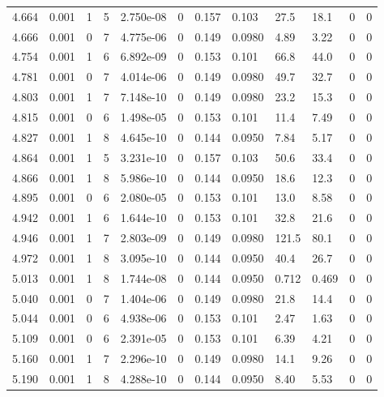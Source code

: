 \documentclass[preview]{standalone}
\begin{document}
{{{{{\begin{tabular}{L{1.2cm}C{1.2cm} C{0.3cm}C{0.5cm} C{1.4cm}C{1.4cm} C{1.4cm}C{1.4cm} C{1.6cm}C{1.6cm} C{1.6cm}C{1.6cm}}
  4.664  &  0.001  & 1     &  5 &  2.750e-08  & 0  &  0.157&   0.103& 27.5 & 18.1   &  0 & 0  \\ 
  4.666  &  0.001  & 0     &  7 &  4.775e-06  & 0  &  0.149&   0.0980& 4.89 & 3.22   &  0 & 0  \\ 
  4.754  &  0.001  & 1     &  6 &  6.892e-09  & 0  &  0.153&   0.101& 66.8 & 44.0   &  0 & 0  \\ 
  4.781  &  0.001  & 0     &  7 &  4.014e-06  & 0  &  0.149&   0.0980& 49.7 & 32.7   &  0 & 0  \\ 
  4.803  &  0.001  & 1     &  7 &  7.148e-10  & 0  &  0.149&   0.0980& 23.2 & 15.3   &  0 & 0  \\ 
  4.815  &  0.001  & 0     &  6 &  1.498e-05  & 0  &  0.153&   0.101& 11.4 & 7.49   &  0 & 0  \\ 
  4.827  &  0.001  & 1     &  8 &  4.645e-10  & 0  &  0.144&   0.0950& 7.84 & 5.17   &  0 & 0  \\ 
  4.864  &  0.001  & 1     &  5 &  3.231e-10  & 0  &  0.157&   0.103& 50.6 & 33.4   &  0 & 0  \\ 
  4.866  &  0.001  & 1     &  8 &  5.986e-10  & 0  &  0.144&   0.0950& 18.6 & 12.3   &  0 & 0  \\ 
  4.895  &  0.001  & 0     &  6 &  2.080e-05  & 0  &  0.153&   0.101& 13.0 & 8.58   &  0 & 0  \\ 
  4.942  &  0.001  & 1     &  6 &  1.644e-10  & 0  &  0.153&   0.101& 32.8 & 21.6   &  0 & 0  \\ 
  4.946  &  0.001  & 1     &  7 &  2.803e-09  & 0  &  0.149&   0.0980& 121.5 & 80.1   &  0 & 0  \\ 
  4.972  &  0.001  & 1     &  8 &  3.095e-10  & 0  &  0.144&   0.0950& 40.4 & 26.7   &  0 & 0  \\ 
  5.013  &  0.001  & 1     &  8 &  1.744e-08  & 0  &  0.144&   0.0950& 0.712 & 0.469   &  0 & 0  \\ 
  5.040  &  0.001  & 0     &  7 &  1.404e-06  & 0  &  0.149&   0.0980& 21.8 & 14.4   &  0 & 0  \\ 
  5.044  &  0.001  & 0     &  6 &  4.938e-06  & 0  &  0.153&   0.101& 2.47 & 1.63   &  0 & 0  \\ 
  5.109  &  0.001  & 0     &  6 &  2.391e-05  & 0  &  0.153&   0.101& 6.39 & 4.21   &  0 & 0  \\ 
  5.160  &  0.001  & 1     &  7 &  2.296e-10  & 0  &  0.149&   0.0980& 14.1 & 9.26   &  0 & 0  \\ 
  5.190  &  0.001  & 1     &  8 &  4.288e-10  & 0  &  0.144&   0.0950& 8.40 & 5.53   &  0 & 0  \\ 

\end{tabular}}}}}}
\end{document}
